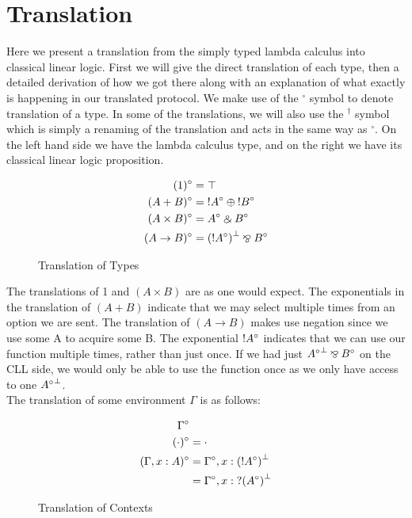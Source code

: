 \chapter{Translation}

Here we present a translation from the simply typed lambda calculus into classical linear logic. First 
we will give the direct translation of each type, then a detailed derivation of how we got there along 
with an explanation of what exactly is happening in our translated protocol. We 
make use of the $^{\circ}$ symbol to denote translation of a type. In some of the translations, we will 
also use the $^\dagger$ symbol which is simply a renaming of the translation and acts in the same way as 
$^\circ$. On the left hand side we have the lambda calculus type, and on the right we have its classical 
linear logic proposition. 
\begin{figure}[h]
  \begin{align*}
      (1)^\circ &= \top\\
      (A + B)^\circ &= \ofc A^\circ \oplus \ofc B^\circ \\
      (A \times B)^\circ &= A^\circ \with B^\circ \\
      (A \rightarrow B)^\circ &= \negg{(\ofc A^\circ)} \parr B^\circ
  \end{align*} 
  \caption{Translation of Types}
  \label{fig: tt}
\end{figure}

\noindent
The translations of 1 and $(A \times B)$ are as one would expect. The exponentials in the translation 
of $(A + B)$ indicate that we may select multiple times from an option we are sent. The translation 
of $(A \rightarrow B)$ makes use negation since we use some A to acquire some B. The exponential $\textrm{!} A^\circ$ 
indicates that we can use our function multiple times, rather than just once. If we had just 
$\negg{A^\circ} \parr B^\circ$ on the CLL side, we would only be able to use the function once as we 
only have access to one $\negg{A^\circ}$. \\

\noindent
The translation of some environment $\Gamma$ is as follows: 
\begin{figure}[h]
  \begin{align*}
    \Gamma^\circ & \\
    (\cdot)^\circ &= \cdot \\
    (\Gamma, x:A)^\circ &= \Gamma^\circ, x: \negg{(\ofc A^\circ)} \\
    &= \Gamma^\circ, x: \whynot \negg{(A^\circ)}
  \end{align*}
  \caption{Translation of Contexts}
  \label{fig: tc} 
\end{figure}

